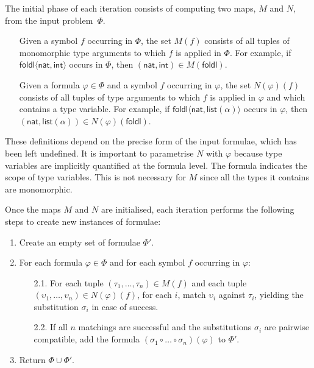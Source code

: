 \documentclass[]{ceurart}
\newcommand\ty[1]{\textsf{#1}}
\newcommand\sym[1]{\textsf{#1}}
\begin{document}
The initial phase of each iteration consists of computing two maps, \(M\) and \(N\), from the input problem~$\Phi$.
%
\begin{enumerate}
\item[\labelitemi] Given a symbol \(f\) occurring in \(\Phi\), the set \(M(f)\) consists of all tuples of monomorphic type arguments to which \(f\) is applied in \(\Phi\). For example, if \(\sym{foldl}\langle \ty{nat}, \ty{int}\rangle\) occurs in \(\Phi\), then \((\ty{nat}, \ty{int}) \in M(\sym{foldl}) \).

\item[\labelitemi] Given a formula \(\varphi \in \Phi\) and a symbol \(f\) occurring in \(\varphi\), the set \(N(\varphi)(f)\) consists of all tuples of type arguments to which \(f\) is applied in \(\varphi\) and which contains a type variable. For example, if \(\sym{foldl}\langle \ty{nat}, \ty{list}(\alpha)\rangle\) occurs in \(\varphi\), then \((\ty{nat}, \ty{list}(\alpha)) \in N(\varphi)(\sym{foldl}) \).
\end{enumerate}

These definitions depend on the precise form of the input formulae, which has been left undefined. It is important to parametrise \(N\) with \(\varphi\) because type variables are implicitly quantified at the formula level. The formula indicates the scope of type variables. This is not necessary for \(M\) since all the types it contains are monomorphic.

Once the maps \(M\) and \(N\) are initialised, each iteration performs the following steps to create new instances of formulae:

\begin{enumerate}

   \item Create an empty set of formulae \(\Phi'\).

   \item For each formula \(\varphi \in \Phi\) and for each symbol \(f\) occurring in \(\varphi\):
   \begin{enumerate}
    \item[2.1.] For each tuple \((\tau_1, \dots, \tau_n) \in  M(f)\) and each tuple \((\upsilon_1, \dots, \upsilon_n) \in N(\varphi)(f)\),
     for each \(i\), match \(\upsilon_i\) against \(\tau_i\), yielding the substitution \(\sigma_i\) in case of success.

    \item[2.2.] If all \(n\) matchings are successful and the substitutions \(\sigma_i\) are pairwise compatible,
add the formula \((\sigma_1 \circ \dots \circ \sigma_n)(\varphi)\) to \(\Phi'\).
   \end{enumerate}

   \item Return \(\Phi \cup \Phi'\).

\end{enumerate}
\end{document}
